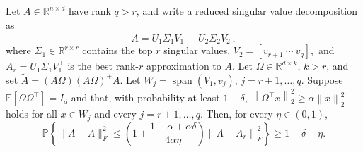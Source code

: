 \documentclass[onefignum,onetabnum]{siamart251216}
\newcommand{\R}{\mathbb{R}}
\newcommand{\E}{\mathbb{E}}
\newcommand{\Prob}{\mathbb{P}}
\newcommand{\norm}[1]{\left\lVert #1 \right\rVert}
\begin{document}
\begin{proposition}\label{prop:rsvd-r-plus-one}
Let $A\in\R^{n\times d}$ have rank $q>r$, and write a reduced singular value decomposition as
\[
A = U_1\Sigma_1V_1^\top + U_2\Sigma_2V_2^\top,
\]
where $\Sigma_1\in\R^{r\times r}$ contains the top $r$ singular values,
$
V_2 = [v_{r+1}\ \cdots\ v_q],
$
and
$
A_r = U_1\Sigma_1V_1^\top
$
is the best rank-$r$ approximation to $A$.  Let $\Omega\in\R^{d\times k}$, $k>r$, and set
$
\widetilde A = (A\Omega)(A\Omega)^+A.
$
Let $W_j=\operatorname{span}(V_1,v_j)$, $j=r+1,\dots,q$. Suppose $\E[\Omega\Omega^\top]=I_d$ and that, with probability at least $1-\delta$, $\norm{\Omega^\top x}_2^2 \ge \alpha \norm{x}_2^2$ holds for all $x\in W_j$ and every $j=r+1,\dots,q$. Then, for every $\eta\in(0,1)$,
\[
\Prob\!\left\{
\|A-\widetilde A\|_F^2
\le
\left(1+\frac{1-\alpha+\alpha\delta}{4\alpha\eta}\right)\norm{A-A_r}_F^2
\right\}
\ge 1-\delta-\eta.
\]
\end{proposition}
\end{document}
